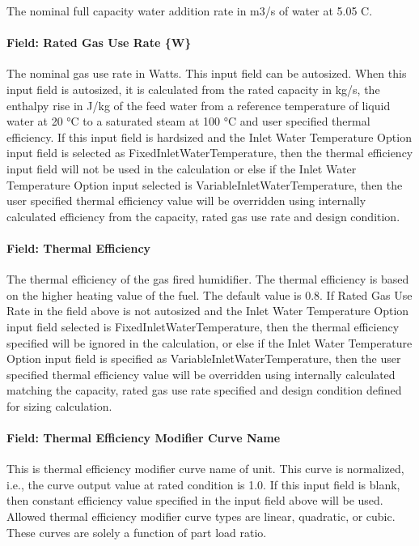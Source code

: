 The nominal full capacity water addition rate in m3/s of water at 5.05 C.

\paragraph{Field: Rated Gas Use Rate \{W\}}\label{field-rated-gas-use-rate-w}

The nominal gas use rate in Watts. This input field can be autosized. When this input field is autosized, it is calculated from the rated capacity in kg/s, the enthalpy rise in J/kg of the feed water from a reference temperature of liquid water at 20 °C to a saturated steam at 100 °C and user specified thermal efficiency. If this input field is hardsized and the Inlet Water Temperature Option input field is selected as FixedInletWaterTemperature, then the thermal efficiency input field will not be used in the calculation or else if the Inlet Water Temperature Option input selected is VariableInletWaterTemperature, then the user specified thermal efficiency value will be overridden using internally calculated efficiency from the capacity, rated gas use rate and design condition.

\paragraph{Field: Thermal Efficiency}\label{field-thermal-efficiency}

The thermal efficiency of the gas fired humidifier. The thermal efficiency is based on the higher heating value of the fuel. The default value is 0.8. If Rated Gas Use Rate in the field above is not autosized and the Inlet Water Temperature Option input field selected is FixedInletWaterTemperature, then the thermal efficiency specified will be ignored in the calculation, or else if the Inlet Water Temperature Option input field is specified as VariableInletWaterTemperature, then the user specified thermal efficiency value will be overridden using internally calculated matching the capacity, rated gas use rate specified and design condition defined for sizing calculation.

\paragraph{Field: Thermal Efficiency Modifier Curve Name}\label{field-thermal-efficiency-modifier-curve-name}

This is thermal efficiency modifier curve name of unit. This curve is normalized, i.e., the curve output value at rated condition is 1.0. If this input field is blank, then constant efficiency value specified in the input field above will be used. Allowed thermal efficiency modifier curve types are linear, quadratic, or cubic. These curves are solely a function of part load ratio.

